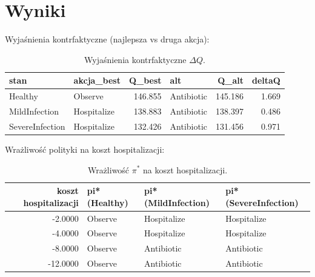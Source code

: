 \documentclass[12pt,a4paper]{article}
\begin{document}
\section{Wyniki}
Wyjaśnienia kontrfaktyczne (najlepsza vs druga akcja):

\begin{table}[H]
\centering
\begin{tabular}{llrlrr}
\toprule
stan & akcja\_best & Q\_best & alt & Q\_alt & deltaQ \\
\midrule
Healthy & Observe & 146.855 & Antibiotic & 145.186 & 1.669 \\
MildInfection & Hospitalize & 138.883 & Antibiotic & 138.397 & 0.486 \\
SevereInfection & Hospitalize & 132.426 & Antibiotic & 131.456 & 0.971 \\
\bottomrule
\end{tabular}

\caption{Wyjaśnienia kontrfaktyczne $\Delta Q$.}
\label{tab:cf}
\end{table}

Wrażliwość polityki na koszt hospitalizacji:

\begin{table}[H]
\centering
\begin{tabular}{rlll}
\toprule
koszt hospitalizacji & pi*(Healthy) & pi*(MildInfection) & pi*(SevereInfection) \\
\midrule
-2.0000 & Observe & Hospitalize & Hospitalize \\
-4.0000 & Observe & Hospitalize & Hospitalize \\
-8.0000 & Observe & Antibiotic & Antibiotic \\
-12.0000 & Observe & Antibiotic & Antibiotic \\
\bottomrule
\end{tabular}

\caption{Wrażliwość $\pi^*$ na koszt hospitalizacji.}
\label{tab:sens}
\end{table}
\end{document}

